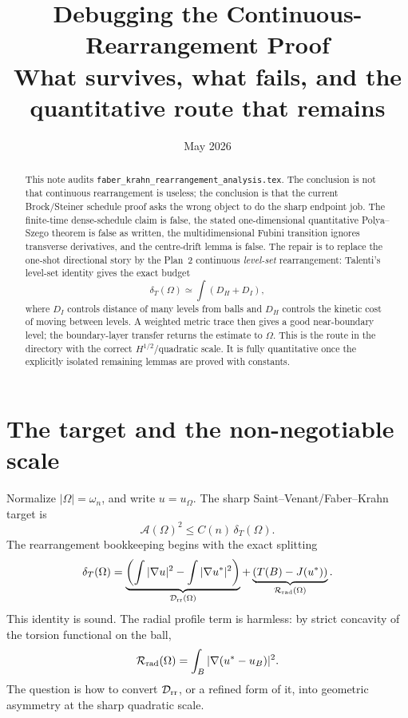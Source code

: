 \documentclass[11pt]{article}
\title{Debugging the Continuous-Rearrangement Proof\\
       \large What survives, what fails, and the quantitative route that remains}
\author{}
\date{May 2026}
\theoremstyle{definition}
\newcommand{\Drr}{\mathcal D_{\rm rr}}
\newcommand{\Rrad}{\mathcal R_{\rm rad}}
\newcommand{\dT}{\delta_T}
\newcommand{\Fr}{\mathcal A}
\begin{document}
\maketitle

\begin{abstract}
This note audits \texttt{faber\_krahn\_rearrangement\_analysis.tex}.
The conclusion is not that continuous rearrangement is useless; the
conclusion is that the current Brock/Steiner schedule proof asks the
wrong object to do the sharp endpoint job.  The finite-time dense-schedule
claim is false, the stated one-dimensional quantitative
Polya--Szego theorem is false as written, the multidimensional Fubini
transition ignores transverse derivatives, and the centre-drift lemma is
false.  The repair is to replace the one-shot directional story by the
Plan~2 continuous \emph{level-set} rearrangement: Talenti's level-set
identity gives the exact budget
\[
   \dT(\Omega)\simeq \int (D_H+D_I),
\]
where \(D_I\) controls distance of many levels from balls and \(D_H\)
controls the kinetic cost of moving between levels.  A weighted metric
trace then gives a good near-boundary level; the boundary-layer transfer
returns the estimate to \(\Omega\).  This is the route in the directory
with the correct \(H^{1/2}\)/quadratic scale.  It is fully quantitative
once the explicitly isolated remaining lemmas are proved with constants.
\end{abstract}

\tableofcontents

\section{The target and the non-negotiable scale}

Normalize \(|\Omega|=\omega_n\), and write \(u=u_\Omega\).  The sharp
Saint--Venant/Faber--Krahn target is
\begin{equation}\label{eq:target}
   \Fr(\Omega)^2 \le C(n)\,\dT(\Omega).
\end{equation}
The rearrangement bookkeeping begins with the exact splitting
\begin{equation}\label{eq:split}
   \dT(\Omega)
   =
   \underbrace{\left(\int |\nabla u|^2-\int |\nabla u^*|^2\right)}_{\Drr(\Omega)}
   +
   \underbrace{\left(T(B)-J(u^*)\right)}_{\Rrad(\Omega)}.
\end{equation}
This identity is sound.  The radial profile term is harmless: by strict
concavity of the torsion functional on the ball,
\[
   \Rrad(\Omega)=\int_B |\nabla(u^*-u_B)|^2.
\]
The question is how to convert \(\Drr\), or a refined form of it, into
geometric asymmetry at the sharp quadratic scale.
\end{document}

